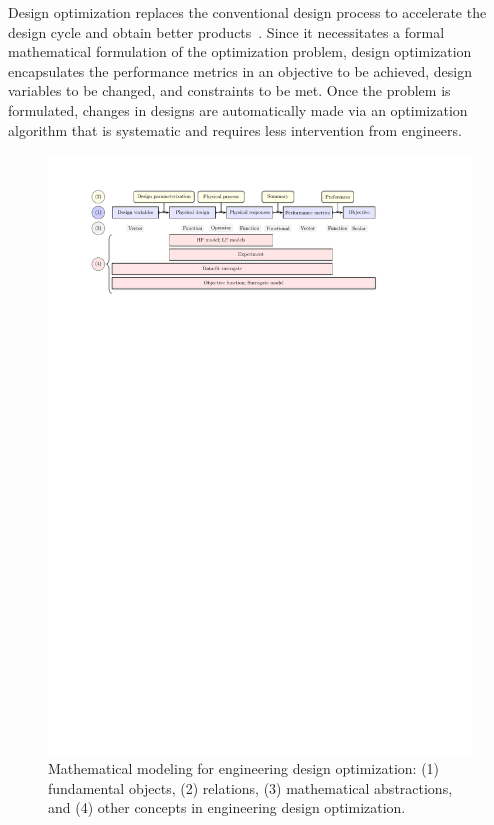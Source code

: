 \documentclass[journal ]{new-aiaa}
\begin{document}
Design optimization replaces the conventional design process to accelerate the design cycle and obtain better products~\citep{Kochenderfer2019,Martins2021}.
Since it necessitates a formal mathematical formulation of the optimization problem, design optimization encapsulates the performance metrics in an objective to be achieved, design variables to be changed, and constraints to be met.
Once the problem is formulated, changes in designs are automatically made via an optimization algorithm that is systematic and requires less intervention from engineers.

\begin{figure}
	\centering
	\includegraphics[scale=0.75]{Fig1.pdf}
	\caption{Mathematical modeling for engineering design optimization: (1) fundamental objects, (2) relations, (3) mathematical abstractions, and (4) other concepts in engineering design optimization.}
	\label{Fig-1}
\end{figure}
\end{document}
